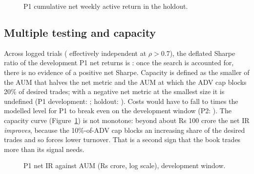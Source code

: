 \begin{figure}[h]\centering{}\caption{P1 cumulative net weekly active return in the holdout.}\end{figure}

\subsection{Multiple testing and capacity}
Across  logged trials ( effectively independent at $\rho>0.7$), the deflated Sharpe ratio of the development P1 net
returns is : once the search is accounted for, there is no evidence of a positive net Sharpe. Capacity is defined as the smaller of
the AUM that halves the net metric and the AUM at which the ADV cap blocks 20\% of desired trades; with a negative net metric at the smallest
size it is undefined (P1 development: ; holdout: ). Costs would have to fall to
 times the modelled level for P1 to break even on the development window (P2: ).
The capacity curve (Figure~\ref{fig:cap}) is not monotone: beyond about Rs 100 crore the net IR \emph{improves}, because the 10\%-of-ADV cap blocks
an increasing share of the desired trades and so forces lower turnover. That is a second sign that the book trades more than its signal needs.
\begin{figure}[h]\centering{}\caption{P1 net IR against AUM (Rs crore, log scale), development window.}\label{fig:cap}\end{figure}
